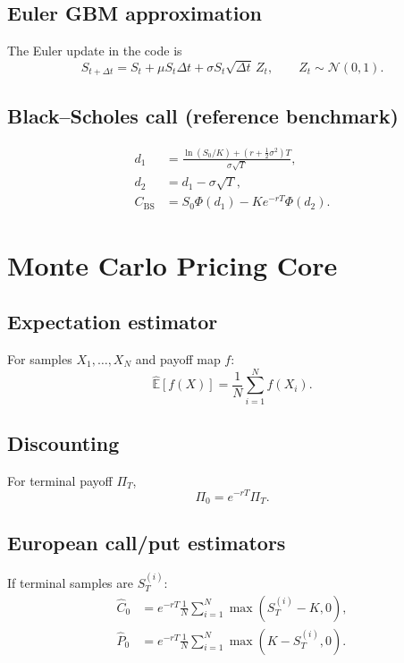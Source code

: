 \documentclass[11pt]{article}
\begin{document}
\subsection{Euler GBM approximation}
The Euler update in the code is
\begin{equation}
S_{t+\Delta t} = S_t + \mu S_t\Delta t + \sigma S_t\sqrt{\Delta t}\,Z_t,
\qquad Z_t\sim\mathcal{N}(0,1).
\end{equation}

\subsection{Black--Scholes call (reference benchmark)}
\begin{align}
 d_1 &= \frac{\ln(S_0/K) + (r + \frac12\sigma^2)T}{\sigma\sqrt{T}},\\
 d_2 &= d_1 - \sigma\sqrt{T},\\
 C_{\text{BS}} &= S_0\Phi(d_1) - Ke^{-rT}\Phi(d_2).
\end{align}

\section{Monte Carlo Pricing Core}

\subsection{Expectation estimator}
For samples $X_1,\dots,X_N$ and payoff map $f$:
\begin{equation}
\widehat{\mathbb{E}}[f(X)] = \frac1N\sum_{i=1}^N f(X_i).
\end{equation}

\subsection{Discounting}
For terminal payoff $\Pi_T$,
\begin{equation}
\Pi_0 = e^{-rT}\Pi_T.
\end{equation}

\subsection{European call/put estimators}
If terminal samples are $S_T^{(i)}$:
\begin{align}
\widehat{C}_0 &= e^{-rT}\frac1N\sum_{i=1}^N \max(S_T^{(i)}-K,0),\\
\widehat{P}_0 &= e^{-rT}\frac1N\sum_{i=1}^N \max(K-S_T^{(i)},0).
\end{align}
\end{document}
